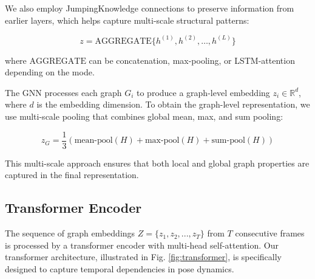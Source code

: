 \documentclass[conference]{IEEEtran}
\begin{document}
We also employ JumpingKnowledge connections \cite{xu2018representation} to
preserve information from earlier layers, which helps capture multi-scale
structural patterns:

\begin{equation}
    z = \text{AGGREGATE}\{h^{(1)}, h^{(2)}, \ldots, h^{(L)}\}
\end{equation}

where $\text{AGGREGATE}$ can be concatenation, max-pooling, or LSTM-attention
depending on the mode.

The GNN processes each graph $G_i$ to produce a graph-level embedding $z_i \in
    \mathbb{R}^d$, where $d$ is the embedding dimension. To obtain the graph-level
representation, we use multi-scale pooling that combines global mean, max, and
sum pooling:

\begin{equation}
    z_G = \frac{1}{3}\left(\text{mean-pool}(H) + \text{max-pool}(H) + \text{sum-pool}(H)\right)
\end{equation}

This multi-scale approach ensures that both local and global graph properties
are captured in the final representation.

\subsection{Transformer Encoder}
The sequence of graph embeddings $Z = \{z_1, z_2, ..., z_T\}$ from $T$
consecutive frames is processed by a transformer encoder with multi-head
self-attention. Our transformer architecture, illustrated in Fig.
\ref{fig:transformer}, is specifically designed to capture temporal
dependencies in pose dynamics.
\end{document}
